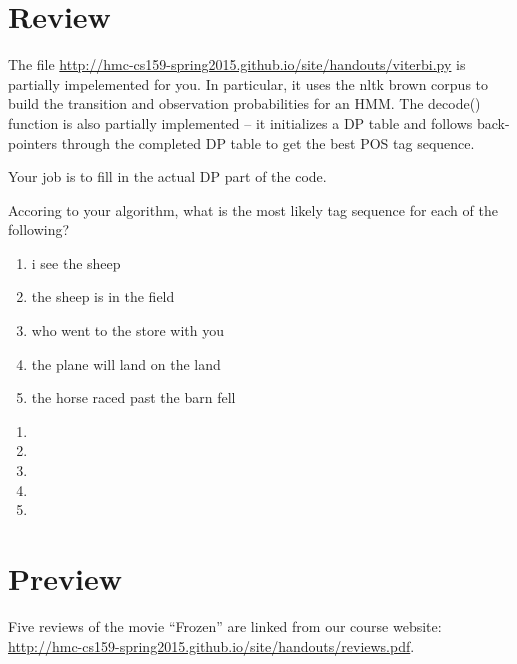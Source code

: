 \documentclass[11pt,letterpaper,boxed]{hmcpset}
\begin{document}
\section*{Review} 
 
The file \url{http://hmc-cs159-spring2015.github.io/site/handouts/viterbi.py} is partially impelemented for
you. In particular, it uses the nltk brown corpus to build the
transition and observation probabilities for an HMM. The decode()
function is also partially implemented -- it initializes a DP table
and follows back-pointers through the completed DP table to get the
best POS tag sequence. 

Your job is to fill in the actual DP part of the code. 

\begin{problem}

Accoring to your algorithm, what is the most likely tag sequence for
each of the following?

\begin{enumerate}
    \item i see the sheep
    \item the sheep is in the field
    \item who went to the store with you
    \item the plane will land on the land
    \item the horse raced past the barn fell
\end{enumerate}

\end{problem}
\begin{solution}

\begin{enumerate}
    \item \vspace{1cm}
    \item \vspace{1cm}
    \item \vspace{1cm}
    \item \vspace{1cm}
    \item \vspace{1cm}
\end{enumerate}

\end{solution}

\pagebreak

\section*{Preview} 
Five reviews of the movie ``Frozen'' are linked from our course
website: \url{http://hmc-cs159-spring2015.github.io/site/handouts/reviews.pdf}.
\end{document}
